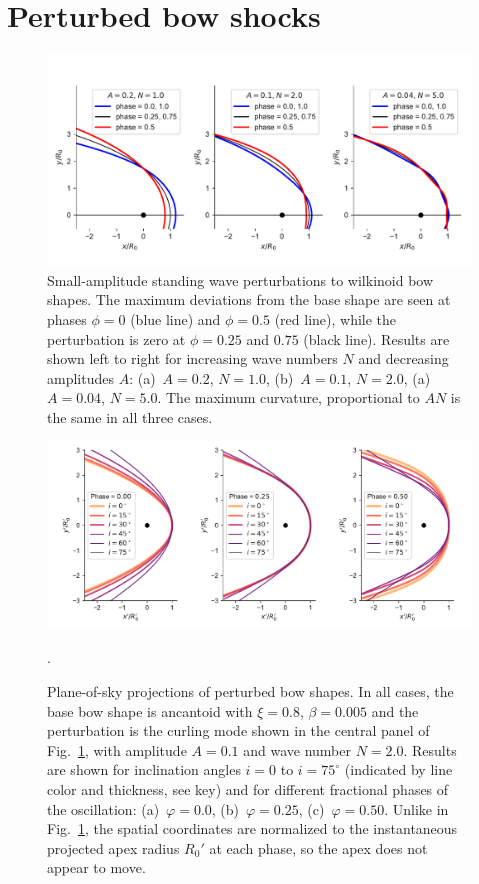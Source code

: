 \section{Perturbed bow shocks}
\label{sec:perturbed-bows}

\begin{figure}
  \centering
  \includegraphics[width=\linewidth]{figs/compare_xyprime_wave-wilkinoid}
  \caption{Small-amplitude standing wave perturbations to wilkinoid
    bow shapes.  The maximum deviations from the base shape are seen
    at phases \(\phi = 0\) (blue line) and \(\phi = 0.5\) (red line), while
    the perturbation is zero at \(\phi = 0.25\) and \(0.75\) (black
    line).  Results are shown left to right for increasing wave
    numbers \(N\) and decreasing amplitudes \(A\): (a)~\(A = 0.2\),
    \(N = 1.0\), (b)~\(A = 0.1\), \(N = 2.0\), (a)~\(A = 0.04\),
    \(N = 5.0\).  The maximum curvature, proportional to \(A N\) is
    the same in all three cases.}
  \label{fig:perturb-shapes}
\end{figure}
\begin{figure}
  \centering
  \includegraphics[width=\linewidth]
  {figs/wave_xyprime-A010-N20-ancantoid-xi080-beta000500}
  \caption{Plane-of-sky projections of perturbed bow shapes.  In all
    cases, the base bow shape is ancantoid with \(\xi = 0.8\),
    \(\beta = 0.005\) and the perturbation is the curling mode shown in
    the central panel of Fig.~\ref{fig:perturb-shapes}, with amplitude
    \(A = 0.1\) and wave number \(N = 2.0\). Results are shown for
    inclination angles \(i = 0\) to \(i = 75^\circ\) (indicated by line
    color and thickness, see key) and for different fractional phases
    of the oscillation: (a)~\(\varphi = 0.0\), (b)~\(\varphi = 0.25\),
    (c)~\(\varphi = 0.50\). Unlike in Fig.~\ref{fig:perturb-shapes}, the
    spatial coordinates are normalized to the instantaneous projected
    apex radius \(R_0'\) at each phase, so the apex does not appear to
    move.}.
  \label{fig:perturb-xy-prime}
\end{figure}

